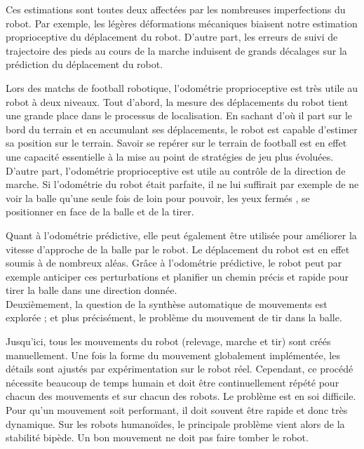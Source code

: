 Ces estimations sont toutes deux affectées par 
les nombreuses imperfections du robot.
Par exemple, les légères déformations mécaniques biaisent 
notre estimation proprioceptive du déplacement du robot.
D'autre part, les erreurs de suivi de trajectoire des pieds 
au cours de la marche induisent de grands décalages sur
la prédiction du déplacement du robot.

Lors des matchs de football robotique, l'odométrie proprioceptive
est très utile au robot à deux niveaux.
Tout d'abord, la mesure des déplacements du robot tient une grande
place dans le processus de localisation. En sachant d'où il part
sur le bord du terrain et en accumulant ses déplacements, le robot
est capable d'estimer sa position sur le terrain.
Savoir se repérer sur le terrain de football est en effet 
une capacité essentielle à la mise au point de stratégies 
de jeu plus évoluées.
D'autre part, l'odométrie proprioceptive est utile 
au contrôle de la direction de marche. 
Si l'odométrie du robot était parfaite, il ne lui suffirait
par exemple de ne voir la balle qu'une seule fois de loin pour
pouvoir, \og les yeux fermés \fg, se positionner en face de 
la balle et de la tirer.

Quant à l'odométrie prédictive, elle peut également être utilisée
pour améliorer la vitesse d'approche de la balle par le robot.
Le déplacement du robot est en effet soumis à de nombreux aléas.
Grâce à l'odométrie prédictive, le robot peut par exemple anticiper
ces perturbations et planifier un chemin précis
et rapide pour tirer la balle dans une direction donnée.\\

Deuxièmement, la question de la synthèse automatique 
de mouvements est explorée ; et plus précisément, 
le problème du mouvement de tir dans la balle.

Jusqu'ici, tous les mouvements du robot (relevage, marche et tir)
sont créés manuellement. Une fois la forme du mouvement globalement 
implémentée, les détails sont ajustés par expérimentation sur le robot réel.
Cependant, ce procédé nécessite beaucoup de temps humain et doit être 
continuellement répété pour chacun des mouvements et sur chacun des robots.
Le problème est en soi difficile. Pour qu'un mouvement soit performant, 
il doit souvent être rapide et donc très dynamique. Sur les robots
humanoïdes, le principale problème vient alors de la stabilité bipède.
Un bon mouvement ne doit pas faire tomber le robot.

